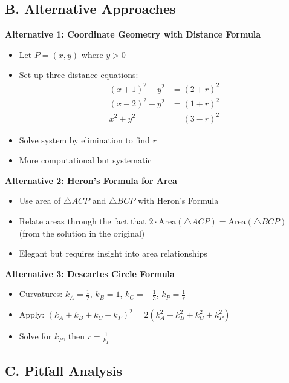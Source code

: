 \documentclass[]{article}
\begin{document}
\begin{solutionbox}
\subsection*{B. Alternative Approaches}

\textbf{Alternative 1: Coordinate Geometry with Distance Formula}
\begin{itemize}[leftmargin=*]
    \item Let $P = (x, y)$ where $y > 0$
    \item Set up three distance equations:
    \begin{align*}
    (x+1)^2 + y^2 &= (2+r)^2\\
    (x-2)^2 + y^2 &= (1+r)^2\\
    x^2 + y^2 &= (3-r)^2
    \end{align*}
    \item Solve system by elimination to find $r$
    \item More computational but systematic
\end{itemize}

\textbf{Alternative 2: Heron's Formula for Area}
\begin{itemize}[leftmargin=*]
    \item Use area of $\triangle ACP$ and $\triangle BCP$ with Heron's Formula
    \item Relate areas through the fact that $2 \cdot \text{Area}(\triangle ACP) = \text{Area}(\triangle BCP)$ (from the solution in the original)
    \item Elegant but requires insight into area relationships
\end{itemize}

\textbf{Alternative 3: Descartes Circle Formula}
\begin{itemize}[leftmargin=*]
    \item Curvatures: $k_A = \frac{1}{2}$, $k_B = 1$, $k_C = -\frac{1}{3}$, $k_P = \frac{1}{r}$
    \item Apply: $(k_A + k_B + k_C + k_P)^2 = 2(k_A^2 + k_B^2 + k_C^2 + k_P^2)$
    \item Solve for $k_P$, then $r = \frac{1}{k_P}$
\end{itemize}

\subsection*{C. Pitfall Analysis}


\end{solutionbox}
\end{document}
